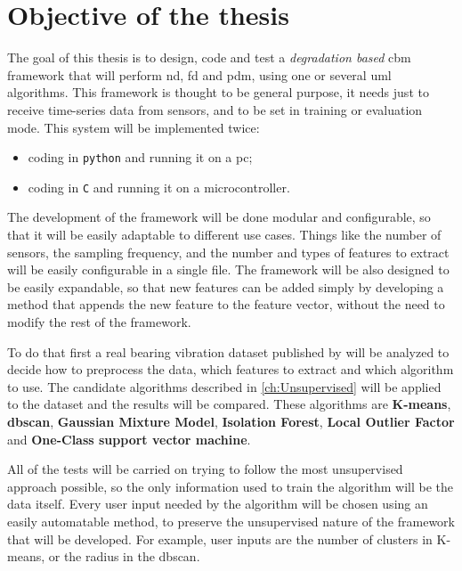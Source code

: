 \section{Objective of the thesis}
\label{sec:objectives}

The goal of this thesis is to design, code and test a \emph{degradation based} \gls{cbm} framework that will perform \gls{nd}, \gls{fd} and \gls{pdm}, using one or several \gls{uml} algorithms. This framework is thought to be general purpose, it needs just to receive time-series data from sensors, and to be set in training or evaluation mode.
This system will be implemented twice:
\begin{itemize}
    \item  coding in \texttt{python} and running it on a \gls{pc};
    \item   coding in \texttt{C} and running it on a microcontroller.
\end{itemize}

The development of the framework will be done modular and configurable, so that it will be easily adaptable to different use cases. Things like the number of sensors, the sampling frequency, and the number and types of features to extract will be easily configurable in a single file. The framework will be also designed to be easily expandable, so that new features can be added simply by developing a method that appends the new feature to the feature vector, without the need to modify the rest of the framework.

To do that first a real bearing vibration dataset published by \cite{IMSpaper} will be analyzed to decide how to preprocess the data, which features to extract and which algorithm to use. 
The candidate algorithms described in \autoref{ch:Unsupervised} will be applied to the dataset and the results will be compared. These algorithms are \textbf{K-means}, \textbf{\gls{dbscan}}, \textbf{Gaussian Mixture Model}, \textbf{Isolation Forest}, \textbf{Local Outlier Factor} and \textbf{One-Class support vector machine}. 

All of the tests will be carried on trying to follow the most unsupervised approach possible, so the only information used to train the algorithm will be the data itself. Every user input needed by the algorithm will be chosen using an easily automatable method, to preserve the unsupervised nature of the framework that will be developed. For example, user inputs are the number of clusters in K-means, or the radius in the \gls{dbscan}.



